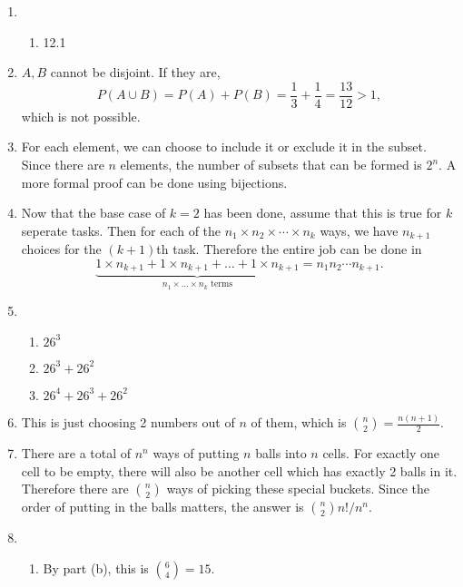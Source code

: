 \documentclass{article}
\begin{document}
\begin{enumerate}
    \item \begin{enumerate}
        \item 12.1
    \end{enumerate}

    \item $A, B$ cannot be disjoint. If they are, \[
        P(A \cup B) = P(A) + P(B) = \frac{1}{3} + \frac{1}{4} = \frac{13}{12} > 1,
    \]
    which is not possible.

    \item For each element, we can choose to include it or exclude it in the subset. Since there
    are $n$ elements, the number of subsets that can be formed is $2^{n}$. A more formal proof
    can be done using bijections.

    \item Now that the base case of $k = 2$ has been done, assume that this is true for $k$
    seperate tasks. Then for each of the $n_1 \times n_2 \times \cdots \times n_k$ ways, we
    have $n_{k + 1}$ choices for the $(k + 1)$th task. Therefore the entire job can be done in
    \[ \underbrace{1 \times n_{k + 1} + 1 \times n_{k + 1} + \dots + 1 \times n_{k + 1}}
    _{n_1 \times ... \times n_k \text{ terms}} = n_1 n_2 \cdots n_{k + 1}. \]

    \item \begin{enumerate}
        \item $26^3$
        \item $26^3 + 26^2$
        \item $26^4 + 26^3 + 26^2$
    \end{enumerate}

    \item This is just choosing 2 numbers out of $n$ of them, which is $\binom{n}{2}
    = \frac{n(n + 1)}{2}$.

    \item There are a total of $n^n$ ways of putting $n$ balls into $n$ cells. For exactly one
    cell to be empty, there will also be another cell which has exactly 2 balls in it. Therefore
    there are $\binom{n}{2}$ ways of picking these special buckets. Since the order of putting
    in the balls matters, the answer is $\binom{n}{2}n! / n^n$.

    \item \begin{enumerate}
        \item By part (b), this is $\binom{6}{4} = 15$.


\end{enumerate}
\end{enumerate}
\end{document}
